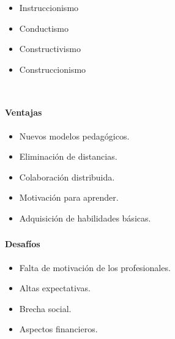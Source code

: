 \begin{frame}
\begin{columns}
 \hspace{0.5cm}
\begin{itemize}[<+->]
	\item Instruccionismo
	\item Conductismo
	\item Constructivismo
	\item Construccionismo
\end{itemize}
\end{columns}


\end{frame}

\begin{frame}
    \frametitle{\pagetitle}
    \framesubtitle{Ventajas}
    \begin{itemize}[<+->]
        \item Nuevos modelos pedagógicos.
        \item Eliminación de distancias.
        \item Colaboración distribuida.
        \item Motivación para aprender.
        \item Adquisición de habilidades básicas.
    \end{itemize}
\end{frame}

\begin{frame}
    \frametitle{\pagetitle}
    \framesubtitle{Desafíos}
	 \begin{itemize}[<+->]
        \item Falta de motivación de los profesionales.
        \item Altas expectativas.
        \item Brecha social.
        \item Aspectos financieros.
    \end{itemize}
\end{frame}
